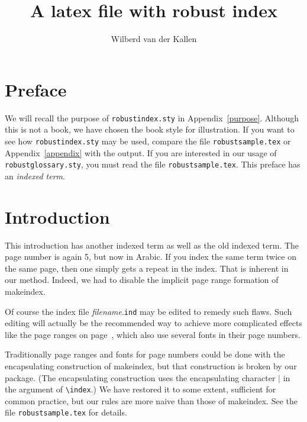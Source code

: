 \documentclass{book}
\title{A latex file with robust index}
\author{Wilberd van der Kallen\index{Wilberd}}
\date{}
\begin{document}
\renewcommand\thepage{\roman{page}}

\maketitle

\tableofcontents
{}

\chapter*{Preface}
We will recall the purpose of \verb|robustindex.sty| in Appendix~\ref{purpose}.
Although this is not a book, we have chosen the book style for illustration.
If you want to see how \verb|robustindex.sty| may be used, compare the file
\verb|robustsample.tex| or Appendix~\ref{appendix} with the output.
If you are interested in our usage of \verb|robustglossary.sty|, 
you must read the file \verb|robustsample.tex|.
This preface has an \emph{indexed term}.


\chapter{Introduction}\sloppy
\renewcommand\thepage{\arabic{page}}
\addtocounter{page}{-2}%
This introduction has another indexed term
as well as the old indexed term.
The page number is again 5, but now in Arabic.
If you index the same term twice on the same page, then one simply gets
a repeat in the index.
That is inherent in our method.
Indeed, we had to disable the implicit page range formation of makeindex.

Of course the index file \textit{filename}.\texttt{ind}
may be edited to remedy such flaws. Such editing will actually be the
recommended way to achieve more complicated effects like the page ranges on
page~\pageref{range}, which also use several fonts in their page numbers.

Traditionally page ranges and fonts for page numbers could be done with the
encapsulating construction of makeindex, but that construction is broken by our
package.
(The encapsulating construction uses the encapsulating character $|$ in the argument of
\verb|\index|.)
We have restored it to some extent, sufficient for common practice,
but our rules are more naive than those of makeindex.
See the file \verb|robustsample.tex| for details.
\end{document}

